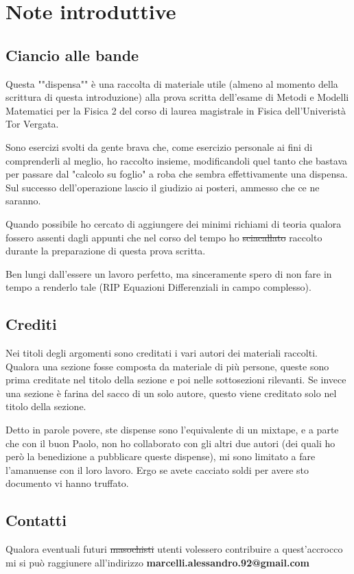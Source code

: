 \chapter{Note introduttive}

\section{Ciancio alle bande}

Questa ""dispensa"" è una raccolta di materiale utile (almeno al momento della scrittura di questa introduzione) alla prova scritta dell'esame  di Metodi e Modelli Matematici per la Fisica 2 del corso di laurea magistrale in Fisica dell'Univeristà Tor Vergata. 

Sono esercizi svolti da gente brava che, come esercizio personale ai fini di comprenderli al meglio, ho raccolto insieme, modificandoli quel tanto che bastava per passare dal "calcolo su foglio" a roba che sembra effettivamente una dispensa. Sul successo dell'operazione lascio il giudizio ai posteri, ammesso che ce ne saranno.

Quando possibile ho cercato di aggiungere dei minimi richiami di teoria qualora fossero assenti dagli appunti che nel corso del tempo ho \st{sciacallato} raccolto durante la preparazione di questa prova scritta.

Ben lungi dall'essere un lavoro perfetto, ma sinceramente spero di non fare in tempo a renderlo tale (RIP Equazioni Differenziali in campo complesso). 

\section{Crediti}

Nei titoli degli argomenti sono creditati i vari autori dei materiali raccolti. Qualora una sezione fosse composta da materiale di più persone, queste sono prima creditate nel titolo della sezione e poi nelle sottosezioni rilevanti. Se invece una sezione è farina del sacco di un solo autore, questo viene creditato solo nel titolo della sezione.

Detto in parole povere, ste dispense sono l'equivalente di un mixtape, e a parte che con il buon Paolo, non ho collaborato con gli altri due autori (dei quali ho però la benedizione a pubblicare queste dispense), mi sono limitato a fare l'amanuense con il loro lavoro. Ergo se avete cacciato soldi per avere sto documento vi hanno truffato.

\section{Contatti}

Qualora eventuali futuri \st{masochisti} utenti volessero contribuire a quest'accrocco mi si può raggiunere all'indirizzo \textbf{marcelli.alessandro.92@gmail.com}

